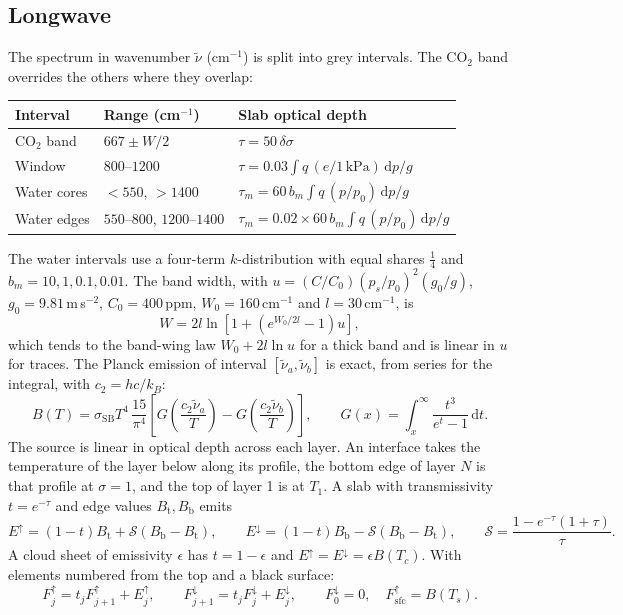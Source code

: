 \documentclass[11pt,a4paper]{article}
\newcommand{\dd}{\mathrm{d}}
\begin{document}
\subsection{Longwave}
The spectrum in wavenumber $\tilde\nu$ (cm$^{-1}$) is split into grey intervals.
The CO$_2$ band overrides the others where they overlap:
\begin{center}
\begin{tabular}{@{}lll@{}}
\toprule
Interval & Range (cm$^{-1}$) & Slab optical depth \\
\midrule
CO$_2$ band & $667 \pm W/2$ & $\tau = 50\,\delta\sigma$ \\
Window & $800$--$1200$ & $\tau = 0.03\int q\,(e/1\,\mathrm{kPa})\,\dd p/g$ \\
Water cores & $<550$, $>1400$ & $\tau_m = 60\,b_m\int q\,(p/p_0)\,\dd p/g$ \\
Water edges & $550$--$800$, $1200$--$1400$ & $\tau_m = 0.02\times60\,b_m\int q\,(p/p_0)\,\dd p/g$ \\
\bottomrule
\end{tabular}
\end{center}
The water intervals use a four-term $k$-distribution with equal shares
$\tfrac14$ and $b_m = 10, 1, 0.1, 0.01$. The band width, with
$u = (C/C_0)(p_s/p_0)^2(g_0/g)$, $g_0 = 9.81$\,m\,s$^{-2}$, $C_0 = 400$\,ppm, $W_0 = 160$\,cm$^{-1}$ and
$l = 30$\,cm$^{-1}$, is
\begin{equation}
W = 2l\ln\!\left[1 + \left(e^{W_0/2l} - 1\right)u\right],
\end{equation}
which tends to the band-wing law $W_0 + 2l\ln u$ for a thick band and is linear in
$u$ for traces. The Planck emission of interval $[\tilde\nu_a, \tilde\nu_b]$ is
exact, from series for the integral, with $c_2 = hc/k_B$:
\begin{equation}
B(T) = \sigma_{\mathrm{SB}}T^4\,\frac{15}{\pi^4}
   \left[G\!\left(\frac{c_2\tilde\nu_a}{T}\right)
       - G\!\left(\frac{c_2\tilde\nu_b}{T}\right)\right], \qquad
G(x) = \int_x^\infty\frac{t^3}{e^t - 1}\,\dd t .
\end{equation}
The source is linear in optical depth across each layer. An interface takes the
temperature of the layer below along its profile, the bottom edge of layer $N$ is
that profile at $\sigma = 1$, and the top of layer 1 is at $T_1$. A slab with
transmissivity $t = e^{-\tau}$ and edge values $B_{\mathrm{t}}, B_{\mathrm{b}}$
emits
\begin{equation}
E^\uparrow = (1-t)B_{\mathrm{t}} + \mathcal{S}(B_{\mathrm{b}} - B_{\mathrm{t}}), \qquad
E^\downarrow = (1-t)B_{\mathrm{b}} - \mathcal{S}(B_{\mathrm{b}} - B_{\mathrm{t}}), \qquad
\mathcal{S} = \frac{1 - e^{-\tau}(1+\tau)}{\tau}.
\end{equation}
A cloud sheet of emissivity $\epsilon$ has $t = 1-\epsilon$ and
$E^\uparrow = E^\downarrow = \epsilon B(T_c)$. With elements numbered from the top
and a black surface:
\begin{equation}
F^\uparrow_{j} = t_j F^\uparrow_{j+1} + E^\uparrow_j, \qquad
F^\downarrow_{j+1} = t_j F^\downarrow_j + E^\downarrow_j, \qquad
F^\downarrow_0 = 0, \quad F^\uparrow_{\mathrm{sfc}} = B(T_s).
\end{equation}
\end{document}
